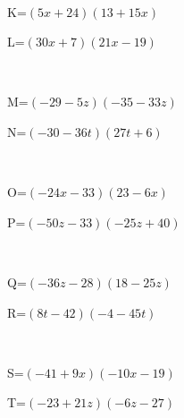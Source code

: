 \documentclass{article}%
\begin{document}
\\%
\begin{minipage}{0.5\textwidth}%
K=$(5x+24)(13+15x)$\\%
\end{minipage}%
\begin{minipage}{0.5\textwidth}%
L=$(30x+7)(21x-19)$\\%
\end{minipage}%
\\%
\begin{minipage}{0.5\textwidth}%
M=$(-29-5z)(-35-33z)$\\%
\end{minipage}%
\begin{minipage}{0.5\textwidth}%
N=$(-30-36t)(27t+6)$\\%
\end{minipage}%
\\%
\begin{minipage}{0.5\textwidth}%
O=$(-24x-33)(23-6x)$\\%
\end{minipage}%
\begin{minipage}{0.5\textwidth}%
P=$(-50z-33)(-25z+40)$\\%
\end{minipage}%
\\%
\begin{minipage}{0.5\textwidth}%
Q=$(-36z-28)(18-25z)$\\%
\end{minipage}%
\begin{minipage}{0.5\textwidth}%
R=$(8t-42)(-4-45t)$\\%
\end{minipage}%
\\%
\begin{minipage}{0.5\textwidth}%
S=$(-41+9x)(-10x-19)$\\%
\end{minipage}%
\begin{minipage}{0.5\textwidth}%
T=$(-23+21z)(-6z-27)$\\%
\end{minipage}%
\\

%
\newpage%
\end{document}
